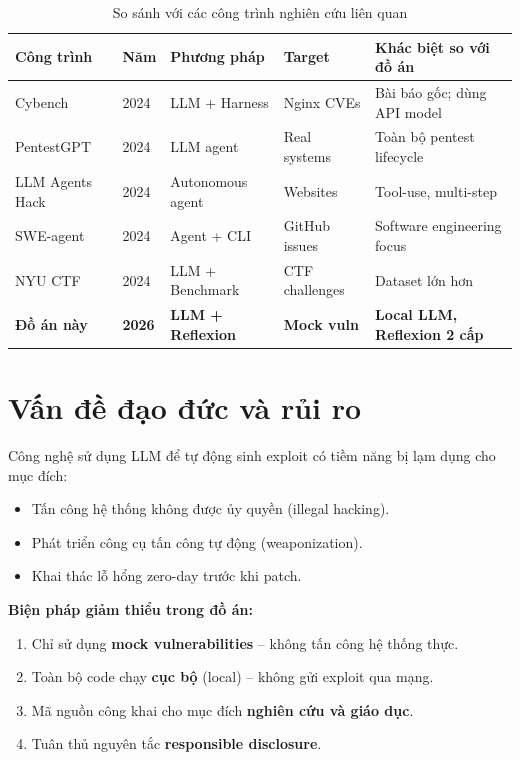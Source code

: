 \documentclass{nt521report}
\begin{document}
\begin{table}[H]
  \centering
  \caption{So sánh với các công trình nghiên cứu liên quan}
  \label{tab:compare-related}
  \begin{tabularx}{\textwidth}{l l l l X}
    \toprule
    \textbf{Công trình} & \textbf{Năm} & \textbf{Phương pháp} & \textbf{Target} & \textbf{Khác biệt so với đồ án} \\
    \midrule
    Cybench \cite{honestcybereval2024} & 2024 & LLM + Harness & Nginx CVEs & Bài báo gốc; dùng API model \\
    PentestGPT \cite{deng2024pentestgpt} & 2024 & LLM agent & Real systems & Toàn bộ pentest lifecycle \\
    LLM Agents Hack \cite{fang2024llmagent} & 2024 & Autonomous agent & Websites & Tool-use, multi-step \\
    SWE-agent \cite{yang2024sweagent} & 2024 & Agent + CLI & GitHub issues & Software engineering focus \\
    NYU CTF \cite{shao2024nyu_ctf} & 2024 & LLM + Benchmark & CTF challenges & Dataset lớn hơn \\
    \textbf{Đồ án này} & \textbf{2026} & \textbf{LLM + Reflexion} & \textbf{Mock vuln} & \textbf{Local LLM, Reflexion 2 cấp} \\
    \bottomrule
  \end{tabularx}
\end{table}

\section{Vấn đề đạo đức và rủi ro}
\label{sec:ethics}

\begin{warningbox}[title={Rủi ro đạo đức}]
  Công nghệ sử dụng LLM để tự động sinh exploit có tiềm năng bị lạm dụng cho mục đích:
  \begin{itemize}
    \item Tấn công hệ thống không được ủy quyền (illegal hacking).
    \item Phát triển công cụ tấn công tự động (weaponization).
    \item Khai thác lỗ hổng zero-day trước khi patch.
  \end{itemize}
\end{warningbox}

\textbf{Biện pháp giảm thiểu trong đồ án:}
\begin{enumerate}
  \item Chỉ sử dụng \textbf{mock vulnerabilities} -- không tấn công hệ thống thực.
  \item Toàn bộ code chạy \textbf{cục bộ} (local) -- không gửi exploit qua mạng.
  \item Mã nguồn công khai cho mục đích \textbf{nghiên cứu và giáo dục}.
  \item Tuân thủ nguyên tắc \textbf{responsible disclosure}.
\end{enumerate}
\end{document}
